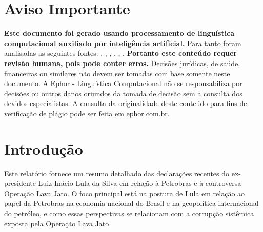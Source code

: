 \documentclass[
   article,       
   12pt,          
   oneside,       
   a4paper,       
   english,       
   brazil,        
   sumario=tradicional
   ]{abntex2}
\begin{document}
\frenchspacing 
\maketitle

\textual
\section{Aviso Importante}
\textbf{Este documento foi gerado usando processamento de linguística computacional auxiliado por inteligência artificial.} Para tanto foram analisadas as seguintes fontes:  \cite{Ao_retomar_refinaria_Lula_justifica_calote_da}, \cite{Carlos_Madeiro_Lula_volta_a_refinaria_em_PE_q}, \cite{Lula_em_Pernambuco_nao_e_um_erro_Sao_varios__}, \cite{Para_manter_a_dependencia_externa_Globo_ataca}, \cite{Petrobras_anuncia_investimento_de_ate_R_8_bil}, \cite{Petrobras_PETR4_investimentos_em_refinaria_pi}.
\textbf{Portanto este conteúdo requer revisão humana, pois pode conter erros.} Decisões jurídicas, de saúde, financeiras ou similares não devem ser tomadas com base somente neste documento. A Ephor - Linguística Computacional não se responsabiliza por decisões ou outros danos oriundos da tomada de decisão sem a consulta dos devidos especialistas.
A consulta da originalidade deste conteúdo para fins de verificação de plágio pode ser feita em \href{http://www.ephor.com.br}{ephor.com.br}.
\section{Introdução}Este relatório fornece um resumo detalhado das declarações recentes do ex-presidente Luiz Inácio Lula da Silva em relação à Petrobras e à controversa Operação Lava Jato. O foco principal está na postura de Lula em relação ao papel da Petrobras na economia nacional do Brasil e na geopolítica internacional do petróleo, e como essas perspectivas se relacionam com a corrupção sistêmica exposta pela Operação Lava Jato.
\end{document}
